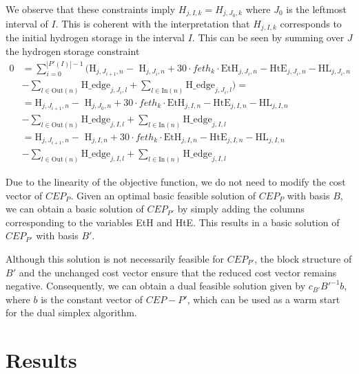 \documentclass[english]{article}
\numberwithin{definition}{section}
\numberwithin{theorem}{section}
\numberwithin{problem}{section}
\begin{document}
We observe that these constraints imply \(H_{j,I,k} = H_{j,J_0,k}\) where \(J_0\) is the leftmost interval of \(I\). This is coherent with the interpretation that \(H_{j,I,k}\) corresponds to the initial hydrogen storage in the interval \(I\). This can be seen by summing over \(J\) the hydrogen storage constraint %
\begin{align*}
 0 & = \sum_{i=0}^{|P'(I)|-1}\bigl(\text{H}_{j,J_{i+1},n}  - \text{ H}_{j,J_{i},n} + 30 \cdot feth_k \cdot \text{EtH}_{j,J_{i},n} - \text{HtE}_{j,J_{i},n} - \text{HL}_{j,J_{i},n} \\
&- \sum_{l \in \text{Out}(n)} \text{H\_edge}_{j,J_{i},l}  + \sum_{l \in \text{In}(n)} \text{H\_edge}_{j,J_{i},l} \bigr) =  \\  
&=   \text{H}_{j,J_{i+1},n}  - \text{ H}_{j,J_{0},n} + 30 \cdot feth_k \cdot \text{EtH}_{j,I,n} - \text{HtE}_{j,I,n} - \text{HL}_{j,I,n}  \\ 
&-\sum_{l \in \text{Out}(n)} \text{H\_edge}_{j,I,l}  + \sum_{l \in \text{In}(n)} \text{H\_edge}_{j,I,l} \\ 
&= \text{H}_{j,J_{i+1},n}  - \text{ H}_{j,I, n} + 30 \cdot feth_k \cdot \text{EtH}_{j,I,n} - \text{HtE}_{j,I,n} - \text{HL}_{j,I,n} \\
&- \sum_{l \in \text{Out}(n)} \text{H\_edge}_{j,I,l}  + \sum_{l \in \text{In}(n)} \text{H\_edge}_{j,I,l}
\end{align*}

Due to the linearity of the objective function, we do not need to modify the cost vector of \(CEP_P\). Given an optimal basic feasible solution of \(CEP_P\) with basis \(B\), we can obtain a basic solution of \(CEP_{P'}\) by simply adding the columns corresponding to the variables EtH and HtE. This results in a basic solution of \(CEP_{P'}\) with basis \(B'\).

Although this solution is not necessarily feasible for \(CEP_{P'}\), the block structure of \(B'\) and the unchanged cost vector ensure that the reduced cost vector remains negative. Consequently, we can obtain a dual feasible solution given by \(c_{B'} B'^{-1} b\), where \(b\) is the constant vector of \(CEP-P'\), which can be used as a warm start for the dual simplex algorithm.

\section{Results}
\end{document}
